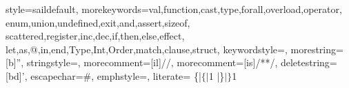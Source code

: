 \usepackage[T1]{fontenc}
\usepackage[scaled=0.82]{beramono}
\usepackage{amssymb}


  {style=saildefault,
   morekeywords={val,function,cast,type,forall,overload,operator,
                 enum,union,undefined,exit,and,assert,sizeof,
                 scattered,register,inc,dec,if,then,else,effect,
                 let,as,@,in,end,Type,Int,Order,match,clause,struct},
   keywordstyle={\bf\ttfamily},
   morestring=[b]'',
   stringstyle={\ttfamily\color{red}},
   morecomment=[il]{//},
   morecomment=[is]{/*}{*/},
   deletestring=[bd]{'},
   escapechar=\#,
   emphstyle={\it},
   literate=
      {\{|}{{$\{|$}}1
      {|\}}{{$|\}$}}1
  }


{
  \newcommand{\saildocfcl}[2]{}
  \newcommand{\saildocfn}[2]{}
  \newcommand{\saildoctype}[2]{}
}

\newenvironment{formalspec}
{ \vspace{-0.2in}
  \begin{quotation}
  \noindent
  \small \em
  \rule{\linewidth}{1pt}\\
}
{
  \rule{\linewidth}{1pt}
  \end{quotation}
  \vspace{-0.2in}
}
